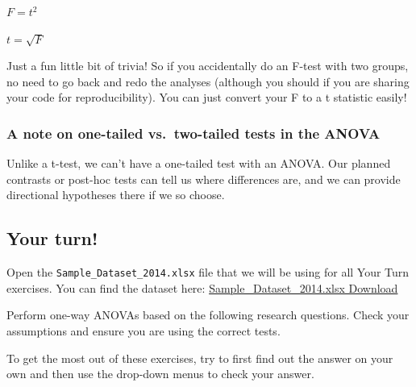 \documentclass[
]{book}
\begin{document}
\(F = t^2\)

\(t = \sqrt{F}\)

Just a fun little bit of trivia! So if you accidentally do an F-test with two groups, no need to go back and redo the analyses (although you should if you are sharing your code for reproducibility). You can just convert your F to a t statistic easily!

\hypertarget{a-note-on-one-tailed-vs.-two-tailed-tests-in-the-anova}{%
\subsubsection{A note on one-tailed vs.~two-tailed tests in the ANOVA}\label{a-note-on-one-tailed-vs.-two-tailed-tests-in-the-anova}}

Unlike a t-test, we can't have a one-tailed test with an ANOVA. Our planned contrasts or post-hoc tests can tell us where differences are, and we can provide directional hypotheses there if we so choose.

\hypertarget{your-turn-5}{%
\subsection{Your turn!}\label{your-turn-5}}

Open the \texttt{Sample\_Dataset\_2014.xlsx} file that we will be using for all Your Turn exercises. You can find the dataset here: \href{https://github.com/danawanzer/stats-with-jamovi/blob/master/data/Sample_Dataset_2014.xlsx}{Sample\_Dataset\_2014.xlsx Download}

Perform one-way ANOVAs based on the following research questions. Check your assumptions and ensure you are using the correct tests.

To get the most out of these exercises, try to first find out the answer on your own and then use the drop-down menus to check your answer.
\end{document}
